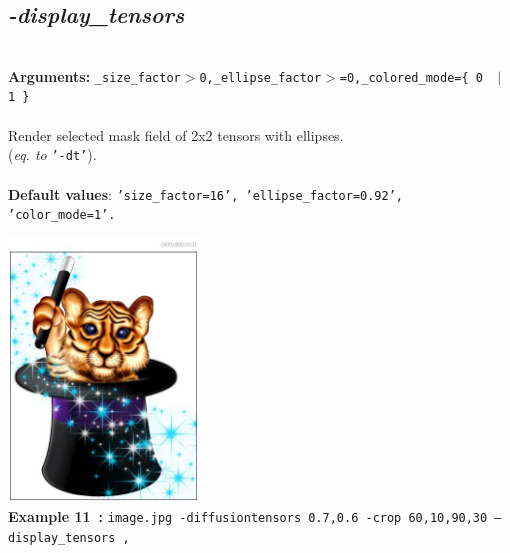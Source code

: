 \documentclass[a4paper,11pt,twoside]{book}
\begin{document}
\subsection{\emph{-display\_tensors} }\vspace*{-0.5em}
~\\\textbf{Arguments: } 
{\small \texttt{\_size\_factor$>$0,\_ellipse\_factor$>$=0,\_colored\_mode=\{ 0 ~$|$~ 1 \}}}\\~\\
Render selected mask field of 2x2 tensors with ellipses.
~\\(\emph{eq. to} {\small \texttt{'-dt'}}).
~\\~\\\textbf{Default values}: {\small \texttt{'size\_factor=16', 'ellipse\_factor=0.92', 'color\_mode=1'.}}
\begin{center}\includegraphics[keepaspectratio=true,height=7cm,width=\textwidth]{img/gmic_def11.jpg}\\
{\footnotesize \textbf{Example 11~:} \texttt{image.jpg -diffusiontensors 0.7,0.6 -crop 60,10,90,30 --display\_tensors ,}}
\end{center}
\end{document}
